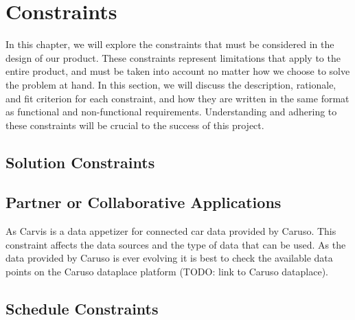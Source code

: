 \chapter{Constraints}

In this chapter, we will explore the constraints that must be considered in the design of our product. These constraints represent limitations that apply to the entire product, and must be taken into account no matter how we choose to solve the problem at hand. In this section, we will discuss the description, rationale, and fit criterion for each constraint, and how they are written in the same format as functional and non-functional requirements. Understanding and adhering to these constraints will be crucial to the success of this project.

\section{Solution Constraints}


\section{Partner or Collaborative Applications}

As Carvis is a data appetizer for connected car data provided by Caruso. This constraint affects the data sources and the type of data that can be used. As the data provided by Caruso is ever evolving it is best to check the available data points on the Caruso dataplace platform (TODO: link to Caruso dataplace).



\section{Schedule Constraints}

